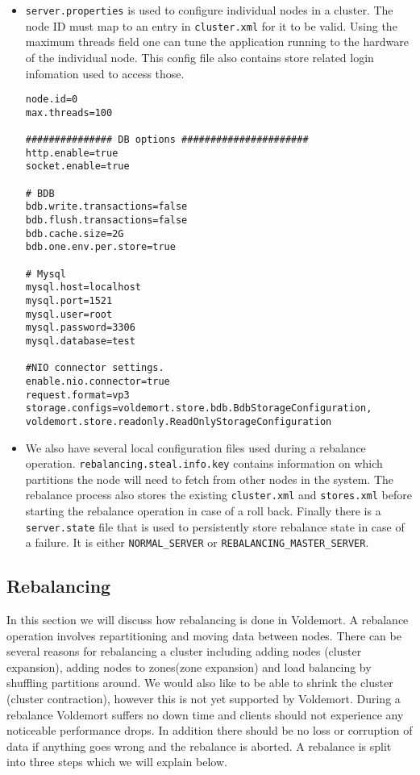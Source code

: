 \begin{itemize}
\item \texttt{server.properties} is used to configure individual nodes in a cluster. The node ID must map to an entry in \texttt{cluster.xml} for it to be valid. Using the maximum threads field one can tune the application running to the hardware of the individual node. This config file also contains store related login infomation used to access those. 

\begin{verbatim}
node.id=0
max.threads=100

############### DB options ######################
http.enable=true
socket.enable=true

# BDB
bdb.write.transactions=false
bdb.flush.transactions=false
bdb.cache.size=2G
bdb.one.env.per.store=true

# Mysql
mysql.host=localhost
mysql.port=1521
mysql.user=root
mysql.password=3306
mysql.database=test

#NIO connector settings.
enable.nio.connector=true
request.format=vp3
storage.configs=voldemort.store.bdb.BdbStorageConfiguration, voldemort.store.readonly.ReadOnlyStorageConfiguration
\end{verbatim}

\item We also have several local configuration files used during a rebalance operation. \texttt{rebalancing.steal.info.key} contains information on which partitions the node will need to fetch from other nodes in the system. The rebalance process also stores the existing \texttt{cluster.xml} and \texttt{stores.xml} before starting the rebalance operation in case of a roll back. Finally there is a \texttt{server.state} file that is used to persistently store rebalance state in case of a failure. It is either \texttt{NORMAL\_SERVER} or \texttt{REBALANCING\_MASTER\_SERVER}. 

\end{itemize}

\subsection{Rebalancing}
In this section we will discuss how rebalancing is done in Voldemort. A rebalance operation involves repartitioning and moving data between nodes. There can be several reasons for rebalancing a cluster including adding nodes (cluster expansion), adding nodes to zones(zone expansion) and load balancing by shuffling partitions around. We would also like to be able to shrink the cluster (cluster contraction), however this is not yet supported by Voldemort. During a rebalance Voldemort suffers no down time and clients should not experience any noticeable performance drops. In addition there should be no loss or corruption of data if anything goes wrong and the rebalance is aborted. A rebalance is split into three steps which we will explain below. 

